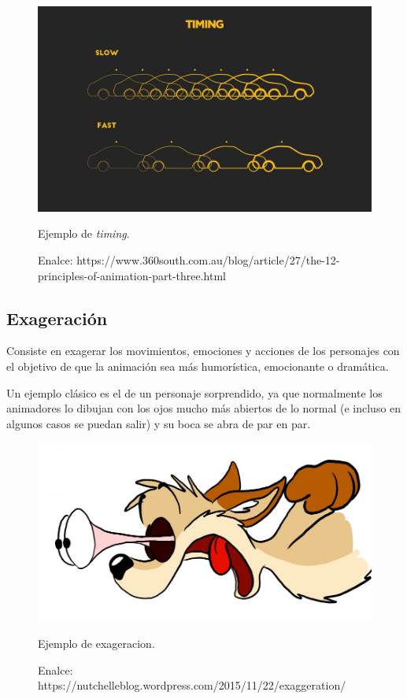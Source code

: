 \documentclass{article}
\begin{document}
\begin{figure}[H]
    \centering
    \includegraphics[width=\textwidth]{imagenes/image-9_timing.jpg}
    \caption{Ejemplo de \textit{timing}.}
    \caption{Enalce: https://www.360south.com.au/blog/article/27/the-12-principles-of-animation-part-three.html}
\end{figure}

\subsection{Exageración}

Consiste en exagerar los movimientos, emociones y acciones de los personajes con el objetivo de que la animación sea más humorística, emocionante o dramática.

\bigskip

Un ejemplo clásico es el de un personaje sorprendido, ya que normalmente los animadores lo dibujan con los ojos mucho más abiertos de lo normal (e incluso en algunos casos se puedan salir) y su boca se abra de par en par.

\begin{figure}[H]
    \centering
    \includegraphics[width=\textwidth]{imagenes/080104_eyes.jpg}
    \caption{Ejemplo de exageracion.}
    \caption{Enalce: https://nutchelleblog.wordpress.com/2015/11/22/exaggeration/}
\end{figure}
\end{document}
